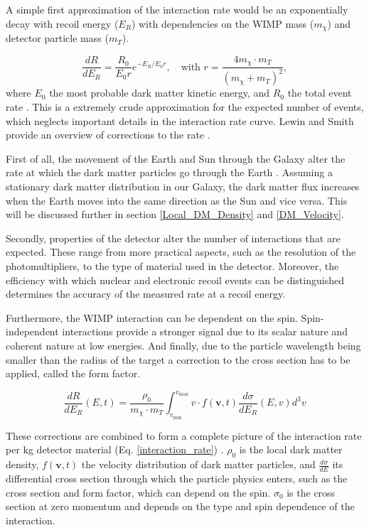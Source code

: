 \documentclass{article}
\begin{document}
A simple first approximation of the interaction rate would be an exponentially decay with recoil energy ($E_R$) with dependencies on the WIMP mass ($m_\chi$) and detector particle mass ($m_T$). 

\begin{equation}
    \frac{dR}{dE_R} = \frac{R_0}{E_0 r} e^{-E_R/E_0r}, \quad \mbox{with } r = \frac{4m_{\chi} \cdot m_T}{(m_{\chi} + m_T)^2}, 
\end{equation}
where $E_0$ the most probable dark matter kinetic energy, and $R_0$ the total event rate \cite{Lewin:1995rx}. This is a extremely crude approximation for the expected number of events, which neglects important details in the interaction rate curve. Lewin and Smith provide an overview of corrections to the rate \cite{Lewin:1995rx}. 

First of all, the movement of the Earth and Sun through the Galaxy alter the rate at which the dark matter particles go through the Earth \cite{Spergel:1987kx}. Assuming a stationary dark matter distribution in our Galaxy, the dark matter flux increases when the Earth moves into the same direction as the Sun and vice versa. This will be discussed further in section \ref{Local_DM_Density} and \ref{DM_Velocity}.

Secondly, properties of the detector alter the number of interactions that are expected. These range from more practical aspects, such as the resolution of the photomultipliers, to the type of material used in the detector. Moreover, the efficiency with which nuclear and electronic recoil events can be distinguished determines the accuracy of the measured rate at a recoil energy.

Furthermore, the WIMP interaction can be dependent on the spin. Spin-independent interactions provide a stronger signal due to its scalar nature and coherent nature at low energies. And finally, due to the particle wavelength being smaller than the radius of the target a correction to the cross section has to be applied, called the form factor.

\begin{equation} \label{interaction_rate}
    \frac{dR}{dE_R}(E,t) = \frac{\rho_0}{m_\chi \cdot m_T} \int_{v_\text{min}}^{v_\text{max}} v \cdot f(\textbf{v},t) \frac{d \sigma}{dE_R} (E, v)d^3v
\end{equation}

These corrections are combined to form a complete picture of the interaction rate per kg detector material (Eq. \ref{interaction_rate}) \cite{Lewin:1995rx, Undagoitia:2015gya}. $\rho_0$ is the local dark matter density, $f(\mathbf{v}, t)$ the velocity distribution of dark matter particles, and $\tfrac{d\sigma}{dE}$ its differential cross section through which the particle physics enters, such as the cross section and form factor, which can depend on the spin. $\sigma_0$ is the cross section at zero momentum and depends on the type and spin dependence of the interaction. 
\end{document}
